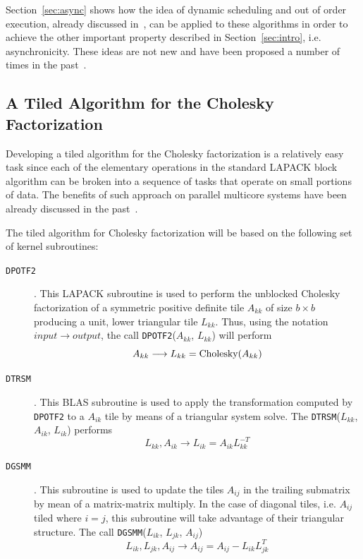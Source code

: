 \documentclass{article}
\begin{document}
Section~\ref{sec:async} shows how the idea of dynamic scheduling and
out of order execution, already discussed
in~\cite{Kurzak:2006:ILA,para06}, can be applied to these algorithms
in order to achieve the other important property described in
Section~\ref{sec:intro}, i.e. asynchronicity.  These ideas are not new
and have been proposed a number of times in the past~\cite{jordan,
  hep}.

\subsection{A Tiled Algorithm for the Cholesky Factorization}
Developing a tiled algorithm for the Cholesky factorization is a
relatively easy task since each of the elementary operations in the
standard LAPACK block algorithm can be broken into a sequence of
tasks that operate on small portions of data. The benefits of such
approach on parallel multicore systems have been already
discussed in the past~\cite{cell_chol,1248397,three,1014508}. 

The tiled algorithm for Cholesky factorization will be based on the
following set of kernel subroutines:
\begin{description}
\item[\texttt{DPOTF2}]. This LAPACK subroutine is used to perform the unblocked
  Cholesky factorization of a symmetric positive definite tile $A_{kk}$ of size $b \times
  b$ producing a unit, lower triangular tile $L_{kk}$. Thus, using the
  notation $input \longrightarrow output$, the call
  \texttt{DPOTF2}($A_{kk}$, $L_{kk}$) will perform
  \begin{displaymath}
    A_{kk} \longrightarrow L_{kk} = \textmd{Cholesky}(A_{kk})
  \end{displaymath}
\item[\texttt{DTRSM}]. This BLAS subroutine is used to apply the
  transformation computed by \texttt{DPOTF2} to a $A_{ik}$ tile by
  means of a triangular system solve. The \texttt{DTRSM}($L_{kk}$,
  $A_{ik}$, $L_{ik}$) performs
  \begin{displaymath}
    L_{kk}, A_{ik} \longrightarrow L_{ik} = A_{ik}L_{kk}^{-T}
  \end{displaymath}
\item[\texttt{DGSMM}]. This subroutine is used to update the tiles $A_{ij}$ in
  the trailing submatrix by mean of a matrix-matrix multiply. In the
  case of diagonal tiles, i.e. $A_{ij}$ tiled where $i=j$, this
  subroutine will take advantage of their triangular structure.
  The call \texttt{DGSMM}($L_{ik}$, $L_{jk}$, $A_{ij}$)
  \begin{displaymath}
    L_{ik}, L_{jk}, A_{ij} \longrightarrow A_{ij}=A_{ij}-L_{ik}L_{jk}^T
  \end{displaymath}
\end{description}
\end{document}
